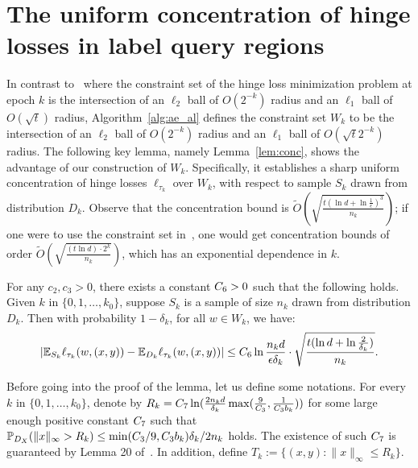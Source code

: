 
\section{The uniform concentration of hinge losses in label query regions}
\label{sec:conc}
In contrast to~\cite{ABHZ16} where the constraint set of the hinge loss minimization problem at epoch $k$ is the intersection of an $\ell_2$ ball of $O(2^{-k})$ radius and an $\ell_1$ ball of $O(\sqrt{t})$ radius,
Algorithm~\ref{alg:ae_al} defines the constraint set $W_k$ to be the intersection of an $\ell_2$ ball of $O(2^{-k})$ radius and an $\ell_1$ ball of $O(\sqrt{t} 2^{-k})$ radius. The following key lemma, namely Lemma~\ref{lem:conc}, shows the advantage of our construction of $W_k$.
Specifically, it establishes a sharp uniform concentration of hinge losses $\ell_{\tau_k}$ over $W_k$, with respect to sample $S_k$ drawn from distribution $D_k$. Observe that the concentration bound is $\tilde{O}(\sqrt{\frac{t (\ln d + \ln \frac 1 \epsilon)^3}{n_k}})$; if one were to use the constraint set in~\cite{ABHZ16},
one would get concentration bounds of order $\tilde{O}(\sqrt{\frac{ (t \ln d) \cdot 2^k}{n_k}})$, which has an exponential dependence in $k$.


\begin{lemma}
For any $c_2, c_3 > 0$, there exists a constant $C_6  > 0$ such that the following holds.
Given $k$ in $\{0, 1,\ldots,k_0\}$,
suppose $S_k$ is a sample of size $n_k$ drawn from distribution $D_k$. Then with probability
$1-\delta_k$, for all $w \in W_k$, we have:
\[
|\mathbb{E}_{S_k} \ell_{\tau_k}(w, (x, y)) - \mathbb{E}_{D_k} \ell_{\tau_k}(w, (x, y))|
\leq C_6  \ln\frac{n_k d}{\epsilon \delta_k} \cdot \sqrt{\frac{t(\ln d + \ln \frac 2 {\delta_k})}{n_k}}.
\]
\label{lem:conc}
\end{lemma}

Before going into the proof of the lemma, let us define some notations. For every $k$ in $\{0,1,\ldots,k_0\}$, denote by $R_k = C_7 \ln(\frac{2n_k d}{\delta_k} \max(\frac9{C_3 }, \frac{1}{C_3 b_k}))$ for some large enough positive constant $C_7 $ such that
$\mathbb{P}_{D_X} (\| x \|_\infty > R_k) \leq \min(C_3 /9, C_3  b_k) \delta_k / 2n_k$ holds.
The existence of such $C_7$ is guaranteed by Lemma 20 of~\citet{ABHZ16}.
In addition, define $T_k:= \{(x,y): \| x \|_\infty \leq R_k \}$.


